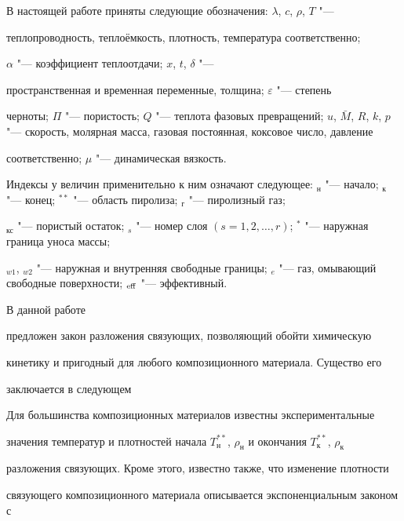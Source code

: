 
В настоящей работе приняты следующие обозначения: $\lambda $, $c$, $\rho $, $T$ "---

теплопроводность, теплоёмкость, плотность, температура соответственно;

$\alpha $ "--- коэффициент теплоотдачи; $x$, $t$, $\delta $ "---

пространственная и временная переменные, толщина; $\varepsilon $ "--- степень

черноты; $\Pi $ "--- пористость; $Q$ "--- теплота фазовых превращений; $u$, $\bar

{M}$, $R$, $k$, $p$ "--- скорость, молярная масса, газовая постоянная, коксовое число, давление

соответственно; $\mu $ "--- динамическая вязкость.



Индексы у величин применительно к ним означают следующее: $_\text{н}$ "--- начало; $_\text{к}$ "--- конец; $^{**}$ "--- область пиролиза; $_\text{г}$ "--- пиролизный газ;

$_\text{кс}$ "--- пористый остаток; $_s$ "--- номер слоя $(s=1, 2,  \dots, r )$; $^*$ "--- наружная граница уноса массы; 

$_{w1}$, $_{w2}$ "--- наружная и внутренняя свободные границы;  $_e$ "--- газ, омывающий свободные поверхности; $_{\rm eff}$ "--- эффективный.



\smallskip





 В данной работе

предложен закон разложения связующих, позволяющий обойти химическую

кинетику и пригодный для любого композиционного материала. Существо его

заключается в следующем



Для большинства композиционных материалов известны экспериментальные

значения температур и плотностей начала $T_\text{н}^{\ast \ast }$, $\rho_\text{н}$ и окончания $T_\text{к}^{\ast \ast }$, $\rho_\text{к}$

разложения связующих. Кроме этого, известно также, что изменение плотности

связующего композиционного материала описывается экспоненциальным законом с

